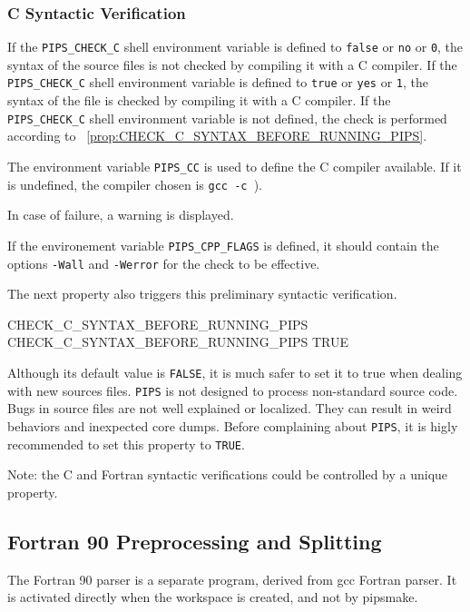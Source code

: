 \documentclass[a4paper]{report}
\newcommand{\PipsPropRef}[1]{\texttt{\detokenize{#1}}~\ref{prop:#1}}
\newcommand{\Pips}{\texttt{PIPS}}
\begin{document}
\subsubsection{C Syntactic Verification}
\label{sec:c-synt-verif}

If the \verb|PIPS_CHECK_C| shell environment variable is defined to
\verb|false| or \verb|no| or \verb|0|, the syntax of the source files
is not checked by compiling it with a C compiler. If the
\verb|PIPS_CHECK_C| shell environment variable is defined to
\verb|true| or \verb|yes| or \verb|1|, the syntax of the file is
checked by compiling it with a C compiler. If the
\verb|PIPS_CHECK_C| shell environment variable is not defined, the
check is performed according to \PipsPropRef{CHECK_C_SYNTAX_BEFORE_RUNNING_PIPS}.

The environment variable
\verb|PIPS_CC| is used to define the C compiler available. If it is undefined, the
compiler chosen is \verb|gcc -c |).

In case of failure, a warning is displayed.

If the environement variable \verb|PIPS_CPP_FLAGS| is defined, it
should contain the options \verb|-Wall| and \verb|-Werror| for the
check to be effective.

The next property also triggers this preliminary syntactic verification.

\begin{PipsProp}{CHECK_C_SYNTAX_BEFORE_RUNNING_PIPS}
CHECK_C_SYNTAX_BEFORE_RUNNING_PIPS TRUE
\end{PipsProp}

Although its default value is \verb|FALSE|, it is much safer to set it
to true when dealing with new sources files. \Pips{} is not designed to
process non-standard source code. Bugs in source files are not well
explained or localized. They can result in weird behaviors and
inexpected core dumps. Before complaining about \Pips{}, it is higly
recommended to set this property to \verb|TRUE|. 

Note: the C and Fortran syntactic verifications could be controlled by
a unique property.

\subsection{Fortran 90 Preprocessing and Splitting}
\label{sec:fortran-90-preprocessing-and-splitting}

The Fortran 90 parser is a separate program, derived from gcc Fortran
parser. It is activated directly when the workspace is created, and
not by pipsmake.
\end{document}
